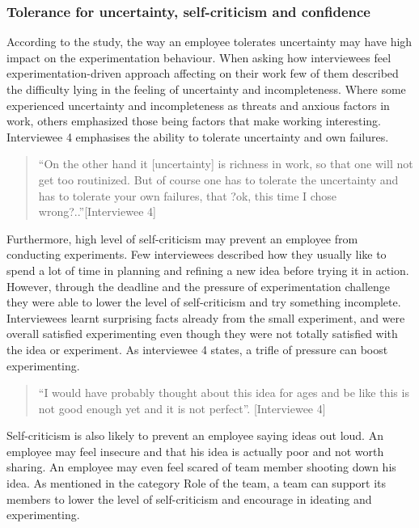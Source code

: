 \subsubsection{Tolerance for uncertainty, self-criticism and confidence}
According to the study, the way an employee tolerates uncertainty may have high impact on the experimentation behaviour. When asking how interviewees feel experimentation-driven approach affecting on their work few of them described the difficulty lying in the feeling of uncertainty and incompleteness. Where some experienced uncertainty and incompleteness as threats and anxious factors in work, others emphasized those being factors that make working interesting. Interviewee 4 emphasises the ability to tolerate uncertainty and own failures.
\begin{quote}
``On the other hand it [uncertainty] is richness in work, so that one will not get too routinized. But of course one has to tolerate the uncertainty and has to tolerate your own failures, that ?ok, this time I chose wrong?..''[Interviewee 4]
\end{quote}
Furthermore, high level of self-criticism may prevent an employee from conducting experiments. Few interviewees described how they usually like to spend a lot of time in planning and refining a new idea before trying it in action. However, through the deadline and the pressure of experimentation challenge they were able to lower the level of self-criticism and try something incomplete. Interviewees learnt surprising facts already from the small experiment, and were overall satisfied experimenting even though they were not totally satisfied with the idea or experiment. As interviewee 4 states, a trifle of pressure can boost experimenting.
\begin{quote}
``I would have probably thought about this idea for ages and be like this is not good enough yet and it is not perfect''. [Interviewee 4]
\end{quote}
Self-criticism is also likely to prevent an employee saying ideas out loud. An employee may feel insecure and that his idea is actually poor and not worth sharing. An employee may even feel scared of team member shooting down his idea. As mentioned in the category Role of the team, a team can support its members to lower the level of self-criticism and encourage in ideating and experimenting. 

